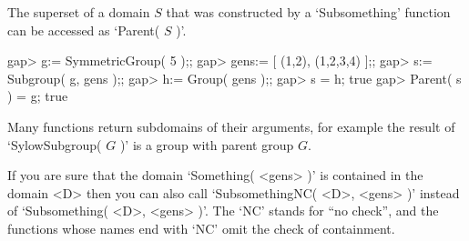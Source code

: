 The superset of a domain $S$ that was constructed by a `Subsomething'
function can be accessed as `Parent( $S$ )'.

\beginexample
    gap> g:= SymmetricGroup( 5 );;
    gap> gens:= [ (1,2), (1,2,3,4) ];;
    gap> s:= Subgroup( g, gens );;
    gap> h:= Group( gens );;
    gap> s = h;
    true
    gap> Parent( s ) = g;
    true
\endexample

Many functions return subdomains of their arguments, for example
the result of `SylowSubgroup( $G$ )' is a group with parent group $G$.

If you are sure that the domain `Something( <gens> )' is contained in the
domain <D> then you can also call `SubsomethingNC( <D>, <gens> )' instead
of `Subsomething( <D>, <gens> )'.
The `NC' stands for ``no check'', and the functions whose names end with
`NC' omit the check of containment.


